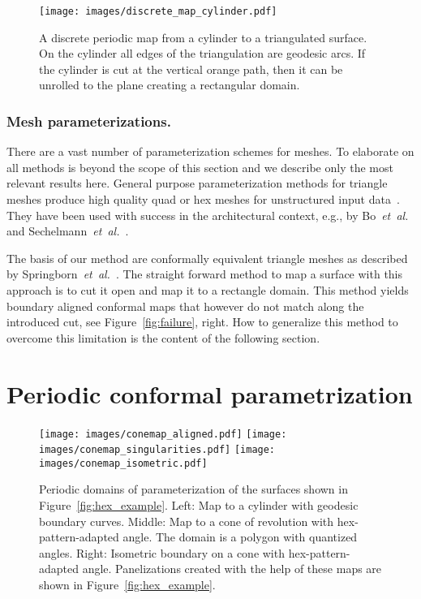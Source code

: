 \documentclass[Thesis.tex]{subfiles}
\begin{document}
\begin{figure}[tb]
\centering
\texttt{[image: images/discrete\_map\_cylinder.pdf]}
\caption{A discrete periodic map from a cylinder to a triangulated
  surface.  On the cylinder all edges of the triangulation are
  geodesic arcs. If the cylinder is cut at the vertical orange path,
  then it can be unrolled to the plane creating a rectangular domain.}
\label{fig:discrete_map}
\end{figure}

\subsubsection{Mesh parameterizations.}
There are a vast number of parameterization schemes for meshes. To
elaborate on all methods is beyond the scope of this section and we
describe only the most relevant results here. General purpose
parameterization methods for triangle meshes produce high quality quad
or hex meshes for unstructured input 
data~\cite{BommesZK2009, AlexaCL2000, Springborn2008}. 
They have been used with success in the architectural context, e.g., by
 Bo~\emph{et~al.}~\cite{BoPKWW2011} and Sechelmann~\emph{et~al.}~\cite{Sechelmann2012}.

The basis of our method are conformally equivalent triangle meshes as
described by Springborn~\emph{et~al.}~\cite{Springborn2008}. The straight forward method to map a
surface with this approach is to cut it open and map it to a rectangle
domain. This method yields boundary aligned conformal maps that
however do not match along the introduced cut, see
Figure~\ref{fig:failure}, right. How to generalize this method to
overcome this limitation is the content of the following section.


\section{Periodic conformal parametrization}
\label{sec:conformal-parameterization}

\begin{figure}[tb]
  \centering
  \texttt{[image: images/conemap\_aligned.pdf]}
  \texttt{[image: images/conemap\_singularities.pdf]}
  \texttt{[image: images/conemap\_isometric.pdf]}
  \caption{Periodic domains of parameterization of the surfaces shown
    in Figure~\ref{fig:hex_example}.  Left: Map to a cylinder with
    geodesic boundary curves. Middle: Map to a cone of revolution with
    hex-pattern-adapted angle. The domain is a polygon with quantized
    angles. Right: Isometric boundary on a cone with
    hex-pattern-adapted angle.  Panelizations created with the help of
    these maps are shown in Figure~\ref{fig:hex_example}.}
  \label{fig:cone_maps_teaser}
\end{figure}
\end{document}
